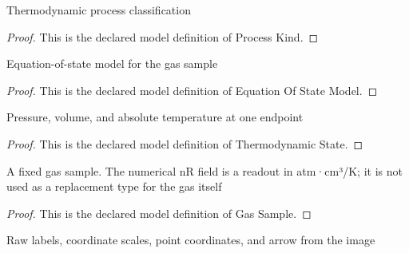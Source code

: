 \begin{definition}
  \label{def:physics:phyx-mini-0362:phyxminiproblems-problemphyxmini0362-processkind}
  Thermodynamic process classification
\end{definition}
\begin{proof}
  This is the declared model definition of Process Kind.
\end{proof}
\begin{definition}
  \label{def:physics:phyx-mini-0362:phyxminiproblems-problemphyxmini0362-equationofstatemodel}
  Equation-of-state model for the gas sample
\end{definition}
\begin{proof}
  This is the declared model definition of Equation Of State Model.
\end{proof}
\begin{definition}
  \label{def:physics:phyx-mini-0362:phyxminiproblems-problemphyxmini0362-thermodynamicstate}
  Pressure, volume, and absolute temperature at one endpoint
\end{definition}
\begin{proof}
  This is the declared model definition of Thermodynamic State.
\end{proof}
\begin{definition}
  \label{def:physics:phyx-mini-0362:phyxminiproblems-problemphyxmini0362-gassample}
  A fixed gas sample. The numerical nR field is a readout in atm·cm³/K; it is not used as a replacement type for the gas itself
\end{definition}
\begin{proof}
  This is the declared model definition of Gas Sample.
\end{proof}
\begin{definition}
  \label{def:physics:phyx-mini-0362:phyxminiproblems-problemphyxmini0362-pressurevolumediagram}
  Raw labels, coordinate scales, point coordinates, and arrow from the image
\end{definition}
